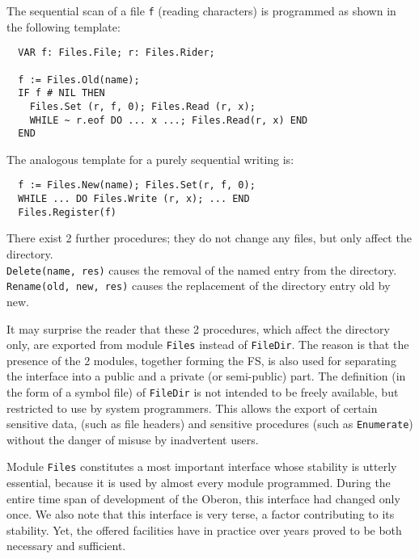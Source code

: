 The sequential scan of a file \verb|f| (reading characters) is programmed as shown in the following
template:
\begin{verbatim}
  VAR f: Files.File; r: Files.Rider;
  
  f := Files.Old(name);
  IF f # NIL THEN
    Files.Set (r, f, 0); Files.Read (r, x);
    WHILE ~ r.eof DO ... x ...; Files.Read(r, x) END
  END
\end{verbatim}

The analogous template for a purely sequential writing is:
\begin{verbatim}
  f := Files.New(name); Files.Set(r, f, 0);
  WHILE ... DO Files.Write (r, x); ... END
  Files.Register(f)
\end{verbatim}

There exist 2 further procedures; they do not change any files, but only affect the directory. \\
\verb|Delete(name, res)| causes the removal of the named entry from the directory. \\
\verb|Rename(old, new, res)| causes the replacement of the directory entry old by new.

It may surprise the reader that these 2 procedures, which affect the directory only, are exported
from module \verb|Files| instead of \verb|FileDir|. The reason is that the presence of the 2 modules,
together forming the FS, is also used for separating the interface into a public and a private (or
semi-public) part. The definition (in the form of a symbol file) of \verb|FileDir| is not intended
to be freely available, but restricted to use by system programmers. This allows the export of
certain sensitive data, (such as file headers) and sensitive procedures (such as \verb|Enumerate|)
without the danger of misuse by inadvertent users.

Module \verb|Files| constitutes a most important interface whose stability is utterly essential,
because it is used by almost every module programmed. During the entire time span of development
of the Oberon, this interface had changed only once. We also note that this interface is very terse,
a factor contributing to its stability. Yet, the offered facilities have in practice over years
proved to be both necessary and sufficient.
